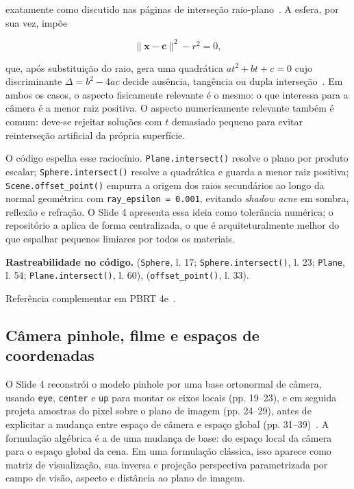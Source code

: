 \documentclass[portuguese]{sbcreviews-2025}%
\newcommand{\slidescite}[2]{\citep[pp.~#2]{#1}}
\newcommand{\pbrtsec}[1]{PBRT 4e~\citep[Se\c{c}\~ao~#1]{pharr2023pbrt}}
\begin{document}
exatamente como discutido nas páginas de interseção raio-plano~\slidescite{inf2608slides04}{10--13}. A esfera, por sua vez, impõe

\[
\lVert\mathbf{x}-\mathbf{c}\rVert^2-r^2=0,
\]

que, após substituição do raio, gera uma quadrática $at^2+bt+c=0$ cujo discriminante $\Delta=b^2-4ac$ decide ausência, tangência ou dupla interseção~\slidescite{inf2608slides04}{14--18}. Em ambos os casos, o aspecto fisicamente relevante é o mesmo: o que interessa para a câmera é a menor raiz positiva. O aspecto numericamente relevante também é comum: deve-se rejeitar soluções com $t$ demasiado pequeno para evitar reinterseção artificial da própria superfície.

O código espelha esse raciocínio. \texttt{Plane.intersect()} resolve o plano por produto escalar; \texttt{Sphere.intersect()} resolve a quadrática e guarda a menor raiz positiva; \texttt{Scene.offset\_point()} empurra a origem dos raios secundários ao longo da normal geométrica com \texttt{ray\_epsilon = 0.001}, evitando \emph{shadow acne} em sombra, reflexão e refração. O Slide 4 apresenta essa ideia como tolerância numérica; o repositório a aplica de forma centralizada, o que é arquiteturalmente melhor do que espalhar pequenos limiares por todos os materiais.

\noindent\textbf{Rastreabilidade no código.}  (\texttt{Sphere}, l. 17; \texttt{Sphere.intersect()}, l. 23; \texttt{Plane}, l. 54; \texttt{Plane.intersect()}, l. 60),  (\texttt{offset\_point()}, l. 33).

Referência complementar em \pbrtsec{1.2}.

\subsection{Câmera pinhole, filme e espaços de coordenadas}
\label{sec:slide4-camera}

O Slide 4 reconstrói o modelo pinhole por uma base ortonormal de câmera, usando \texttt{eye}, \texttt{center} e \texttt{up} para montar os eixos locais (pp. 19--23), e em seguida projeta amostras do pixel sobre o plano de imagem (pp. 24--29), antes de explicitar a mudança entre espaço de câmera e espaço global (pp. 31--39)~\citep{inf2608slides04}. A formulação algébrica é a de uma mudança de base: do espaço local da câmera para o espaço global da cena. Em uma formulação clássica, isso aparece como matriz de visualização, sua inversa e projeção perspectiva parametrizada por campo de visão, aspecto e distância ao plano de imagem.
\end{document}
